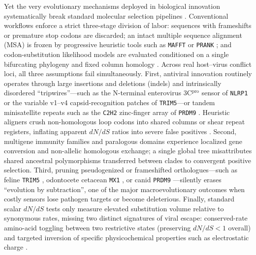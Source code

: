 \documentclass[11pt,letterpaper]{article}
\newcommand{\MAFFT}{\texttt{MAFFT}\xspace}
\begin{document}
Yet the very evolutionary mechanisms deployed in biological innovation systematically break standard molecular selection pipelines \citep{fletcher2010indelible,jordan2012effects}. Conventional workflows enforce a strict three-stage division of labor: sequences with frameshifts or premature stop codons are discarded; an intact multiple sequence alignment (MSA) is frozen by progressive heuristic tools such as \MAFFT \citep{katoh2013mafft} or \texttt{PRANK} \citep{loytynoja2008phylogeny}; and codon-substitution likelihood models \citep{goldman1994codon,muse1994likelihood} are evaluated conditioned on a single bifurcating phylogeny and fixed column homology \citep{pond2005not,murrell2012detecting}. Across real host--virus conflict loci, all three assumptions fail simultaneously. First, antiviral innovation routinely operates through large insertions and deletions (indels) and intrinsically disordered ``tripwires''---such as the N-terminal enterovirus 3C$^{\text{pro}}$ sensor of \texttt{NLRP1} \citep{chavarria2016proteolytic,tsu2021diverse} or the variable v1--v4 capsid-recognition patches of \texttt{TRIM5}---or tandem minisatellite repeats such as the \texttt{C2H2} zinc-finger array of \texttt{PRDM9} \citep{oliver2009prdm9,patel2016prdm9gene}. Heuristic aligners crush non-homologous loop codons into shared columns or shear repeat registers, inflating apparent $dN/dS$ ratios into severe false positives \citep{fletcher2010indelible,jordan2012effects}. Second, multigene immunity families and paralogous domains experience localized gene conversion and non-allelic homologous exchange; a single global tree misattributes shared ancestral polymorphisms transferred between clades to convergent positive selection. Third, pruning pseudogenized or frameshifted orthologues---such as feline \texttt{TRIM5} \citep{mcewan2009truncated}, odontocete cetacean \texttt{MX1} \citep{braun2015loss}, or canid \texttt{PRDM9} \citep{munoz2011orphan}---silently erases ``evolution by subtraction'', one of the major macroevolutionary outcomes when costly sensors lose pathogen targets or become deleterious. Finally, standard scalar $dN/dS$ tests only measure elevated substitution volume relative to synonymous rates, missing two distinct signatures of viral escape: conserved-rate amino-acid toggling between two restrictive states (preserving $dN/dS < 1$ overall) and targeted inversion of specific physicochemical properties such as electrostatic charge \citep{tenthorey2020mutational,mitchell2012evolution}.
\end{document}
